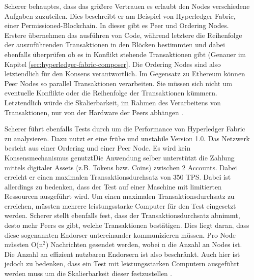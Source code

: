 Scherer behauptes, dass das größere Vertrauen es erlaubt den Nodes verschiedene Aufgaben zuzuteilen. Dies beschreibt er am Beispiel von Hyperledger Fabric, einer Permissioned-Blockchain. In dieser gibt es Peer und Ordering Nodes. Erstere übernehmen das ausführen von Code, während letztere die Reihenfolge der auszuführenden Transaktionen in den Blöcken bestimmten und dabei ebenfalls überprüfen ob es in Konflikt stehende Transaktionen gibt (Genauer im Kapitel \ref{sec:hyperledger-fabric-composer}. Die Ordering Nodes sind also letztendlich für den Konsens verantwortlich. Im Gegensatz zu Ethereum können Peer Nodes so parallel Transaktionen verarbeiten. Sie müssen sich nicht um eventuelle Konflikte oder die Reihenfolge der Transaktionen kümmern. Letztendlich würde die Skalierbarkeit, im Rahmen des Verarbeitens von Transaktionen, nur von der Hardware der Peers abhängen \cite{SchererPerformanceScalabilityBlockchain2017}.

Scherer führt ebenfalls Tests durch um die Performance von Hyperledger Fabric zu analysieren. Dazu nutzt er eine frühe und unstabile Version 1.0. Das Netzwerk besteht aus einer Ordering und einer Peer Node. Es wird kein Konsensmechanismus genutztDie Anwendung selber unterstützt die Zahlung mittels digitaler Assets (z.B. Tokens bzw. Coins) zwischen 2 Accounts. Dabei erreicht er einen maximalen Transaktionsdurchsatz von 350 TPS. Dabei ist allerdings zu bedenken, dass der Test auf einer Maschine mit limitierten Ressourcen ausgeführt wird. Um einen maximalen Transaktionsdurchsatz zu erreichen, müssten mehrere leistungsstarke Computer für den Test eingesetzt werden. Scherer stellt ebenfalls fest, dass der Transaktionsdurchsatz abnimmt, desto mehr Peers es gibt, welche Transaktionen bestätigen. Dies liegt daran, dass diese sogenannten Endorser untereinander kommunizieren müssen. Pro Node müssten O(n$^2$) Nachrichten gesendet werden, wobei n die Anzahl an Nodes ist. Die Anzahl an effizient nutzbaren Endorsern ist also beschränkt. Auch hier ist jedoch zu bedenken, dass ein Test mit leistungsstarken Computern ausgeführt werden muss um die Skalierbarkeit dieser festzustellen \cite{SchererPerformanceScalabilityBlockchain2017}.

